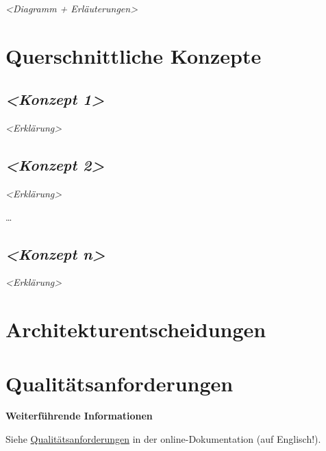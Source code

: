 \documentclass[
]{article}
\begin{document}
\emph{\textless Diagramm + Erläuterungen\textgreater{}}

\hypertarget{section-concepts}{%
  \section{Querschnittliche Konzepte}\label{section-concepts}}

\hypertarget{__emphasis_konzept_1_emphasis}{%
  \subsection{\texorpdfstring{\emph{\textless Konzept
        1\textgreater{}}}{\textless Konzept 1\textgreater{}}}\label{__emphasis_konzept_1_emphasis}}

\emph{\textless Erklärung\textgreater{}}

\hypertarget{__emphasis_konzept_2_emphasis}{%
  \subsection{\texorpdfstring{\emph{\textless Konzept
        2\textgreater{}}}{\textless Konzept 2\textgreater{}}}\label{__emphasis_konzept_2_emphasis}}

\emph{\textless Erklärung\textgreater{}}

\ldots{}

\hypertarget{__emphasis_konzept_n_emphasis}{%
  \subsection{\texorpdfstring{\emph{\textless Konzept
        n\textgreater{}}}{\textless Konzept n\textgreater{}}}\label{__emphasis_konzept_n_emphasis}}

\emph{\textless Erklärung\textgreater{}}

\hypertarget{section-design-decisions}{%
  \section{Architekturentscheidungen}\label{section-design-decisions}}

\hypertarget{section-quality-scenarios}{%
  \section{Qualitätsanforderungen}\label{section-quality-scenarios}}

\textbf{Weiterführende Informationen}

Siehe \href{https://docs.arc42.org/section-10/}{Qualitätsanforderungen}
in der online-Dokumentation (auf Englisch!).
\end{document}
